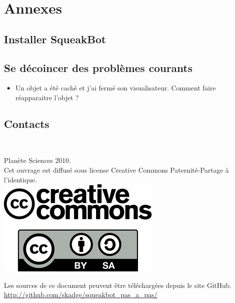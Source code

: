 \documentclass[a4paper,12pt]{book}
\def\appName{SqueakBot}
\begin{document}
\chapter{Annexes}

\section{Installer \appName}

\section{Se décoincer des problèmes courants}

\begin{itemize}
	\item Un objet a été caché et j'ai fermé son visualisateur. Comment faire réapparaitre l'objet ?
\end{itemize}

\section{Contacts}

\printglossaries

\clearpage
\thispagestyle{empty}
~
\vfill
\begin{center}
	Planète Sciences 2010.\\
	Cet ouvrage est diffusé sous license Creative Commons Paternité-Partage à l'identique.\\
	\vspace{2cm}
	\includegraphics[scale=0.5]{logo_cc.png}
\end{center}

\vfill

\begin{center}
	Les sources de ce document peuvent être téléchargées depuis le site GitHub.
	\url{http://github.com/skadge/squeakbot_pas_a_pas/}
\end{center}

\vfill
\end{document}
